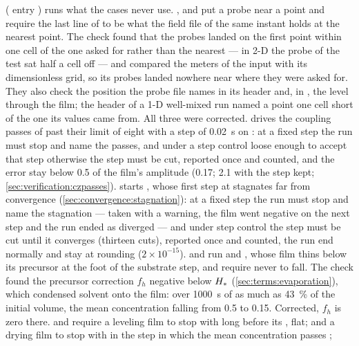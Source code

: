  ( entry ) runs what the
cases never use. ,  and
 put a probe near a point and require the last line of
 to be what the field file of the same instant holds at the
nearest point. The check found that the probes landed on the first point
within one cell of the one asked for rather than the nearest --- in 2-D the probe of the test
sat half a cell off --- and  compared the meters of the input with
its dimensionless grid, so its probes landed nowhere near where they were
asked for. They also check the position the probe file names in its header
and, in , the level through the film; the header of a 1-D
well-mixed run named a point one cell short of the one its values came
from. All three were corrected.
 drives the coupling passes of  past their limit of
eight with a step of \SI{0.02}{\second} on : at a fixed step the run must
stop and name the passes, and under a step control loose enough to accept
that step otherwise the step must be cut, reported once and counted, and the
error stay below 0.5 of the film's amplitude (0.17; 2.1 with the step kept;
\cref{sec:verification:czpasses}).  starts
, whose first step at  stagnates far from
convergence (\cref{sec:convergence:stagnation}): at a fixed step the run must
stop and name the stagnation --- taken with a warning, the film went negative
on the next step and the run ended as diverged --- and under step control the
step must be cut until it converges (thirteen cuts), reported once and counted,
the run end normally and  stay at rounding
($2\times10^{-15}$).  and
 run  and
, whose film thins below its precursor at the foot of
the substrate step, and require  never to fall. The
check found the precursor correction $f_h$ negative below $H_{*}$
(\cref{sec:terms:evaporation}), which condensed solvent onto the film: over
\SI{1000}{\second} of  as much as \SI{43}{\percent}
of the initial volume, the mean concentration falling from 0.5 to 0.15.
Corrected, $f_h$ is zero there.  and
 require a leveling film
to stop with  long before its , flat;
 and  a drying film to stop with 
in the step in which the mean concentration passes ;
